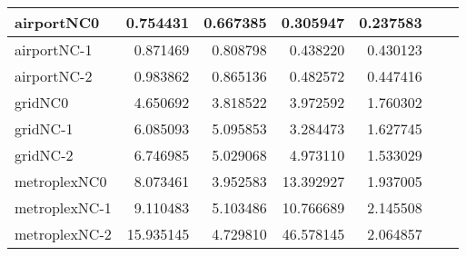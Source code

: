 \begin{longtable}{|l|r|r|r|r|r|r|}
airportNC0 & 0.754431 & 0.667385 & 0.305947 & 0.237583 \\ \hline
airportNC-1 & 0.871469 & 0.808798 & 0.438220 & 0.430123 \\ \hline
airportNC-2 & 0.983862 & 0.865136 & 0.482572 & 0.447416 \\ \hline
gridNC0 & 4.650692 & 3.818522 & 3.972592 & 1.760302 \\ \hline
gridNC-1 & 6.085093 & 5.095853 & 3.284473 & 1.627745 \\ \hline
gridNC-2 & 6.746985 & 5.029068 & 4.973110 & 1.533029 \\ \hline
metroplexNC0 & 8.073461 & 3.952583 & 13.392927 & 1.937005 \\ \hline
metroplexNC-1 & 9.110483 & 5.103486 & 10.766689 & 2.145508 \\ \hline
metroplexNC-2 & 15.935145 & 4.729810 & 46.578145 & 2.064857 \\ \hline
\end{longtable}
